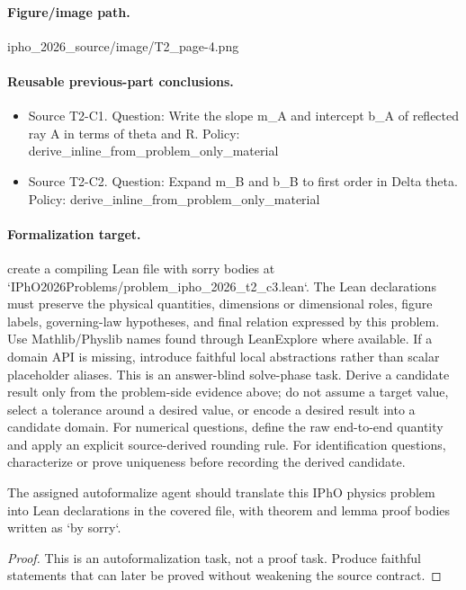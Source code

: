 \paragraph{Figure/image path.}
ipho\_2026\_source/image/T2\_page-4.png

\paragraph{Reusable previous-part conclusions.}
\begin{itemize}
\item Source T2-C1. Question: Write the slope m\_A and intercept b\_A of reflected ray A in terms of theta and R. Policy: derive\_inline\_from\_problem\_only\_material
\item Source T2-C2. Question: Expand m\_B and b\_B to first order in Delta theta. Policy: derive\_inline\_from\_problem\_only\_material
\end{itemize}

\paragraph{Formalization target.}
create a compiling Lean file with sorry bodies at `IPhO2026Problems/problem\_ipho\_2026\_t2\_c3.lean`.
The Lean declarations must preserve the physical quantities, dimensions or dimensional roles, figure labels, governing-law hypotheses, and final relation expressed by this problem.
Use Mathlib/Physlib names found through LeanExplore where available. If a domain API is missing, introduce faithful local abstractions rather than scalar placeholder aliases.
This is an answer-blind solve-phase task. Derive a candidate result only from the problem-side evidence above; do not assume a target value, select a tolerance around a desired value, or encode a desired result into a candidate domain.
For numerical questions, define the raw end-to-end quantity and apply an explicit source-derived rounding rule. For identification questions, characterize or prove uniqueness before recording the derived candidate.

\begin{theorem}
\label{thm:physics:ipho_2026_t2_c3:target}
The assigned autoformalize agent should translate this IPhO physics problem into Lean declarations in the covered file, with theorem and lemma proof bodies written as `by sorry`.
\end{theorem}
\begin{proof}
This is an autoformalization task, not a proof task. Produce faithful statements that can later be proved without weakening the source contract.
\end{proof}
